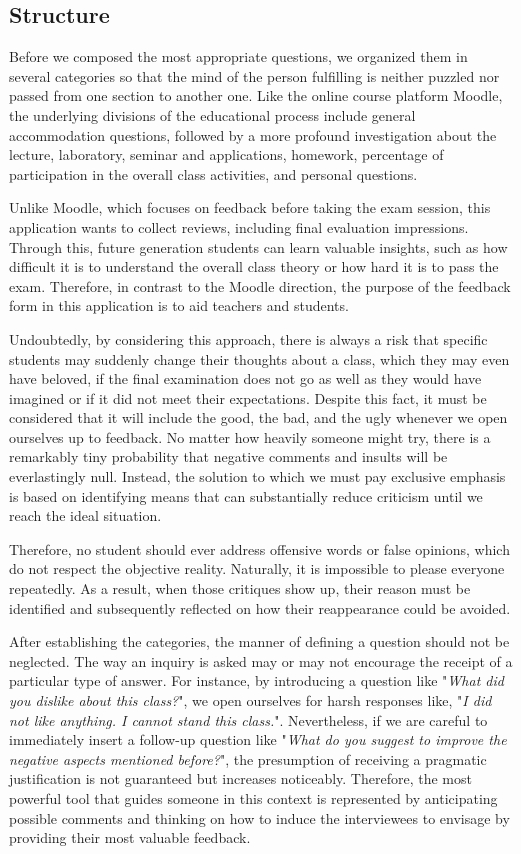 	\subsection{Structure} \label{4:structure}
	
	Before we composed the most appropriate questions, we organized them in several categories so that the mind of the person fulfilling is neither puzzled nor passed from one section to another one. Like the online course platform Moodle, the underlying divisions of the educational process include general accommodation questions, followed by a more profound investigation about the lecture, laboratory, seminar and applications, homework, percentage of participation in the overall class activities, and personal questions.
	
	Unlike Moodle, which focuses on feedback before taking the exam session, this application wants to collect reviews, including final evaluation impressions. Through this, future generation students can learn valuable insights, such as how difficult it is to understand the overall class theory or how hard it is to pass the exam. Therefore, in contrast to the Moodle direction, the purpose of the feedback form in this application is to aid teachers and students.
	
	Undoubtedly, by considering this approach, there is always a risk that specific students may suddenly change their thoughts about a class, which they may even have beloved, if the final examination does not go as well as they would have imagined or if it did not meet their expectations. Despite this fact, it must be considered that it will include the good, the bad, and the ugly whenever we open ourselves up to feedback. No matter how heavily someone might try, there is a remarkably tiny probability that negative comments and insults will be everlastingly null. Instead, the solution to which we must pay exclusive emphasis is based on identifying means that can substantially reduce criticism until we reach the ideal situation.
	
	Therefore, no student should ever address offensive words or false opinions, which do not respect the objective reality. Naturally, it is impossible to please everyone repeatedly. As a result, when those critiques show up, their reason must be identified and subsequently reflected on how their reappearance could be avoided.
	
	After establishing the categories, the manner of defining a question should not be neglected. The way an inquiry is asked may or may not encourage the receipt of a particular type of answer. For instance, by introducing a question like "\textit{What did you dislike about this class?}", we open ourselves for harsh responses like, "\textit{I did not like anything. I cannot stand this class.}". Nevertheless, if we are careful to immediately insert a follow-up question like "\textit{What do you suggest to improve the negative aspects mentioned before?}", the presumption of receiving a pragmatic justification is not guaranteed but increases noticeably. Therefore, the most powerful tool that guides someone in this context is represented by anticipating possible comments and thinking on how to induce the interviewees to envisage by providing their most valuable feedback.
	
